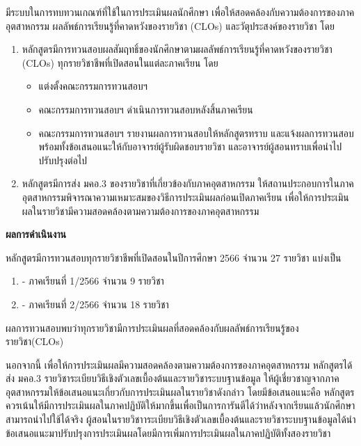 \printprogram{} มีระบบในการทบทวนเกณฑ์ที่ใช้ในการประเมินผลนักศึกษา เพื่อให้สอดคล้องกับความต้องการของภาคอุตสาหกรรม ผลลัพธ์การเรียนรู้ที่คาดหวังของรายวิชา (CLOs) และวัตุประสงค์ของรายวิชา โดย
\begin{enumerate}
	\item หลักสูตรมีการทวนสอบผลสัมฤทธิ์ของนักศึกษาตามผลลัพธ์การเรียนรู้ที่คาดหวังของรายวิชา (CLOs) ทุกรายวิชาชีพที่เปิดสอนในแต่ละภาคเรียน โดย
	\begin{itemize}
		\item แต่งตั้งคณะกรรมการทวนสอบฯ
		\item คณะกรรมการทวนสอบฯ ดำเนินการทวนสอบหลังสิ้นภาคเรียน 
		\item คณะกรรมการทวนสอบฯ รายงานผลการทวนสอบให้หลักสูตรทราบ และแจ้งผลการทวนสอบพร้อมทั้งข้อเสนอแนะให้กับอาจารย์ผู้รับผิดชอบรายวิชา และอาจารย์ผู้สอนทราบเพื่อนำไปปรับปรุงต่อไป 
	\end{itemize}
	\item หลักสูตรมีการส่ง มคอ.3 ของรายวิชาที่เกี่ยวข้องกับภาคอุตสาหกรรม ให้สถานประกอบการในภาคอุตสาหกรรมพิจารณาความเหมาะสมของวิธีการประเมินผลก่อนเปิดภาคเรียน เพื่อให้การประเมินผลในรายวิชามีความสอดคล้องตามความต้องการของภาคอุตสาหกรรม
\end{enumerate}
{\bf ผลการดำเนินงาน}

 หลักสูตรมีการทวนสอบทุกรายวิชาชีพที่เปิดสอนในปีการศึกษา 2566 จำนวน 27 รายวิชา แบ่งเป็น
\begin{enumerate}
	\item[] - ภาคเรียนที่ 1/2566 จำนวน 9 รายวิชา
	\item[] - ภาคเรียนที่ 2/2566 จำนวน 18 รายวิชา
\end{enumerate}
ผลการทวนสอบพบว่าทุกรายวิชามีการประเมินผลที่สอดคล้องกับผลลัพธ์การเรียนรู้ของรายวิชา(CLOs)

นอกจากนี้ เพื่อให้การประเมินผลมีความสอดคล้องตามความต้องการของภาคอุตสาหกรรม หลักสูตรได้ส่ง มคอ.3 รายวิชาระเบียบวิธีเชิงตัวเลขเบื้องต้นและรายวิชาระบบฐานข้อมูล ให้ผู้เชี่ยวชาญจากภาคอุตสาหกรรมให้ข้อเสนอแนะเกี่ยวกับการประเมินผลในรายวิชาดังกล่าว โดยมีข้อเสนอแนะคือ หลักสูตรควรเน้นให้มีการประเมินผลในภาคปฏิบัติให้มากขึ้นเพื่อเป็นการการันตีได้ว่าหลังจากเรียนแล้วนักศึกษาสามารถนำไปใช้ได้จริง
ผู้สอนในรายวิชาาระเบียบวิธีเชิงตัวเลขเบื้องต้นและรายวิชาระบบฐานข้อมูลได้นำข้อเสนอแนะมาปรับปรุงการประเมินผลโดยมีการเพิ่มการประเมินผลในภาคปฏิบัติทั้งสองรายวิชา

\begin{doclist}
\end{doclist}


